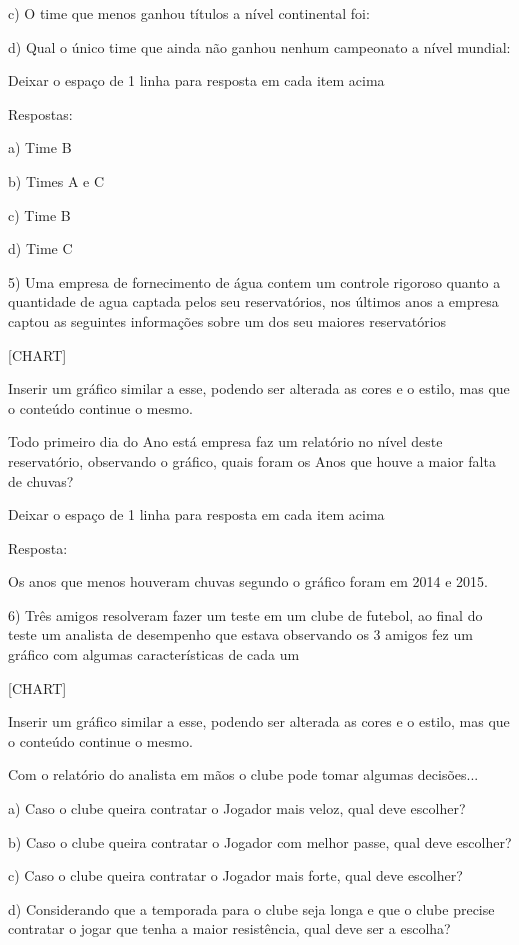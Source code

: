 {c) O time que menos ganhou títulos a nível continental foi:

d) Qual o único time que ainda não ganhou nenhum campeonato a nível
mundial:

Deixar o espaço de 1 linha para resposta em cada item acima

Respostas:

a) Time B

b) Times A e C

c) Time B

d) Time C

5) Uma empresa de fornecimento de água contem um controle rigoroso
quanto a quantidade de agua captada pelos seu reservatórios, nos últimos
anos a empresa captou as seguintes informações sobre um dos seu maiores
reservatórios

{{[}CHART{]}}

Inserir um gráfico similar a esse, podendo ser alterada as cores e o
estilo, mas que o conteúdo continue o mesmo.

Todo primeiro dia do Ano está empresa faz um relatório no nível deste
reservatório, observando o gráfico, quais foram os Anos que houve a
maior falta de chuvas?

Deixar o espaço de 1 linha para resposta em cada item acima

Resposta:

Os anos que menos houveram chuvas segundo o gráfico foram em 2014 e
2015.

6) Três amigos resolveram fazer um teste em um clube de futebol, ao
final do teste um analista de desempenho que estava observando os 3
amigos fez um gráfico com algumas características de cada um

{{[}CHART{]}}

Inserir um gráfico similar a esse, podendo ser alterada as cores e o
estilo, mas que o conteúdo continue o mesmo.

Com o relatório do analista em mãos o clube pode tomar algumas
decisões...

a) Caso o clube queira contratar o Jogador mais veloz, qual deve
escolher?

b) Caso o clube queira contratar o Jogador com melhor passe, qual deve
escolher?

c) Caso o clube queira contratar o Jogador mais forte, qual deve
escolher?

d) Considerando que a temporada para o clube seja longa e que o clube
precise contratar o jogar que tenha a maior resistência, qual deve ser a
escolha?

}
